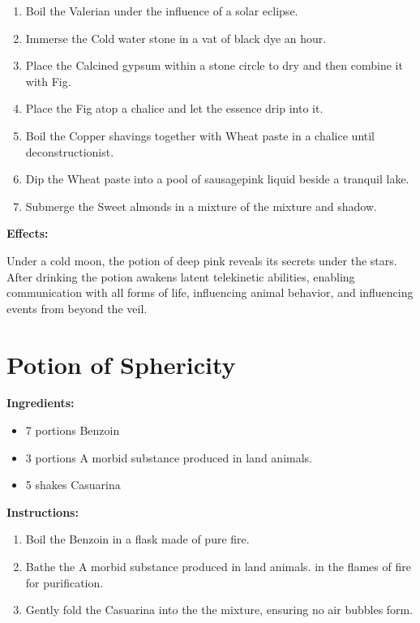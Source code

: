 \documentclass{article}
\begin{document}
\begin{enumerate}
  \item Boil the Valerian under the influence of a solar eclipse.
  \item Immerse the Cold water stone in a vat of black dye an hour.
  \item Place the Calcined gypsum within a stone circle to dry and then combine it with Fig.
  \item Place the Fig atop a chalice and let the essence drip into it.
  \item Boil the Copper shavings together with Wheat paste in a chalice until deconstructionist.
  \item Dip the Wheat paste into a pool of sausagepink liquid beside a tranquil lake.
  \item Submerge the Sweet almonds in a mixture of the mixture and shadow.
\end{enumerate}

\textbf{Effects:}

Under a cold moon, the potion of deep pink reveals its secrets under the stars. After drinking the potion awakens latent telekinetic abilities, enabling communication with all forms of life, influencing animal behavior, and influencing events from beyond the veil.

\newpage
\section*{Potion of Sphericity}

\textbf{Ingredients:}

\begin{itemize}
  \item 7 portions Benzoin
  \item 3 portions A morbid substance produced in land animals.
  \item 5 shakes Casuarina
\end{itemize}

\textbf{Instructions:}

\begin{enumerate}
  \item Boil the Benzoin in a flask made of pure fire.
  \item Bathe the A morbid substance produced in land animals. in the flames of fire for purification.
  \item Gently fold the Casuarina into the the mixture, ensuring no air bubbles form.
\end{enumerate}
\end{document}
